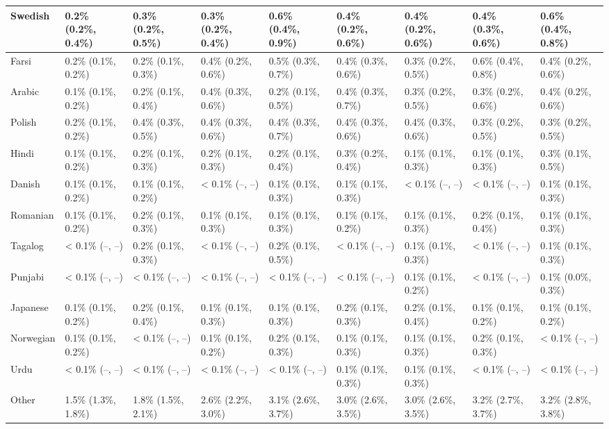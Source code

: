\documentclass[
]{book}
\begin{document}
\begin{table}
\begin{tabular}[t]{>{}l|>{}l|>{}l|>{}l|>{}l|>{}l|>{}l|>{}l|>{}l}
\hline
Swedish & 0.2\% (0.2\%, 0.4\%) & 0.3\% (0.2\%, 0.5\%) & 0.3\% (0.2\%, 0.4\%) & 0.6\% (0.4\%, 0.9\%) & 0.4\% (0.2\%, 0.6\%) & 0.4\% (0.2\%, 0.6\%) & 0.4\% (0.3\%, 0.6\%) & 0.6\% (0.4\%, 0.8\%)\\
\hline
Farsi & 0.2\% (0.1\%, 0.2\%) & 0.2\% (0.1\%, 0.3\%) & 0.4\% (0.2\%, 0.6\%) & 0.5\% (0.3\%, 0.7\%) & 0.4\% (0.3\%, 0.6\%) & 0.3\% (0.2\%, 0.5\%) & 0.6\% (0.4\%, 0.8\%) & 0.4\% (0.2\%, 0.6\%)\\
\hline
Arabic & 0.1\% (0.1\%, 0.2\%) & 0.2\% (0.1\%, 0.4\%) & 0.4\% (0.3\%, 0.6\%) & 0.2\% (0.1\%, 0.5\%) & 0.4\% (0.3\%, 0.7\%) & 0.3\% (0.2\%, 0.5\%) & 0.3\% (0.2\%, 0.6\%) & 0.4\% (0.2\%, 0.6\%)\\
\hline
Polish & 0.2\% (0.1\%, 0.2\%) & 0.4\% (0.3\%, 0.5\%) & 0.4\% (0.3\%, 0.6\%) & 0.4\% (0.3\%, 0.7\%) & 0.4\% (0.3\%, 0.6\%) & 0.4\% (0.3\%, 0.6\%) & 0.3\% (0.2\%, 0.5\%) & 0.3\% (0.2\%, 0.5\%)\\
\hline
Hindi & 0.1\% (0.1\%, 0.2\%) & 0.2\% (0.1\%, 0.3\%) & 0.2\% (0.1\%, 0.3\%) & 0.2\% (0.1\%, 0.4\%) & 0.3\% (0.2\%, 0.4\%) & 0.1\% (0.1\%, 0.3\%) & 0.1\% (0.1\%, 0.3\%) & 0.3\% (0.1\%, 0.5\%)\\
\hline
Danish & 0.1\% (0.1\%, 0.2\%) & 0.1\% (0.1\%, 0.2\%) & < 0.1\% (--, --) & 0.1\% (0.1\%, 0.3\%) & 0.1\% (0.1\%, 0.3\%) & < 0.1\% (--, --) & < 0.1\% (--, --) & 0.1\% (0.1\%, 0.3\%)\\
\hline
Romanian & 0.1\% (0.1\%, 0.2\%) & 0.2\% (0.1\%, 0.3\%) & 0.1\% (0.1\%, 0.3\%) & 0.1\% (0.1\%, 0.3\%) & 0.1\% (0.1\%, 0.2\%) & 0.1\% (0.1\%, 0.3\%) & 0.2\% (0.1\%, 0.4\%) & 0.1\% (0.1\%, 0.3\%)\\
\hline
Tagalog & < 0.1\% (--, --) & 0.2\% (0.1\%, 0.3\%) & < 0.1\% (--, --) & 0.2\% (0.1\%, 0.5\%) & < 0.1\% (--, --) & 0.1\% (0.1\%, 0.3\%) & < 0.1\% (--, --) & 0.1\% (0.1\%, 0.3\%)\\
\hline
Punjabi & < 0.1\% (--, --) & < 0.1\% (--, --) & < 0.1\% (--, --) & < 0.1\% (--, --) & < 0.1\% (--, --) & 0.1\% (0.1\%, 0.2\%) & < 0.1\% (--, --) & 0.1\% (0.0\%, 0.3\%)\\
\hline
Japanese & 0.1\% (0.1\%, 0.2\%) & 0.2\% (0.1\%, 0.4\%) & 0.1\% (0.1\%, 0.3\%) & 0.1\% (0.1\%, 0.3\%) & 0.2\% (0.1\%, 0.3\%) & 0.2\% (0.1\%, 0.4\%) & 0.1\% (0.1\%, 0.2\%) & 0.1\% (0.1\%, 0.2\%)\\
\hline
Norwegian & 0.1\% (0.1\%, 0.2\%) & < 0.1\% (--, --) & 0.1\% (0.1\%, 0.2\%) & 0.2\% (0.1\%, 0.3\%) & 0.1\% (0.1\%, 0.3\%) & 0.1\% (0.1\%, 0.3\%) & 0.2\% (0.1\%, 0.3\%) & < 0.1\% (--, --)\\
\hline
Urdu & < 0.1\% (--, --) & < 0.1\% (--, --) & < 0.1\% (--, --) & < 0.1\% (--, --) & 0.1\% (0.1\%, 0.3\%) & 0.1\% (0.1\%, 0.3\%) & < 0.1\% (--, --) & < 0.1\% (--, --)\\
\hline
Other & 1.5\% (1.3\%, 1.8\%) & 1.8\% (1.5\%, 2.1\%) & 2.6\% (2.2\%, 3.0\%) & 3.1\% (2.6\%, 3.7\%) & 3.0\% (2.6\%, 3.5\%) & 3.0\% (2.6\%, 3.5\%) & 3.2\% (2.7\%, 3.7\%) & 3.2\% (2.8\%, 3.8\%)\\
\hline
\end{tabular}
\end{table}
\end{document}
